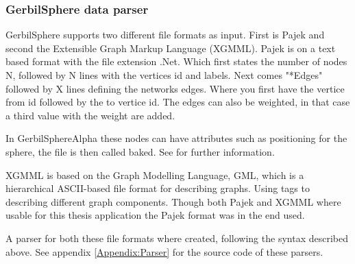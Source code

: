 \documentclass[a4paper,11pt]{kth-mag}
\begin{document}
\begin{appendices}
\subsubsection{GerbilSphere data parser}
GerbilSphere supports two different file formats as input. First is Pajek\cite{website:gephipajek} and second the Extensible Graph Markup Language (XGMML)\cite{website:xgmml}. Pajek is on a text based format with the file 
extension .Net. Which first states the number of nodes N, followed by N lines with the vertices id and labels. Next comes "*Edges" followed by X lines defining the networks edges. Where you first have the vertice from id
followed by the to vertice id. The edges can also be weighted, in that case a third value with the weight are added. 

In GerbilSphereAlpha these nodes can have attributes such as positioning for the sphere, the file is then called baked. See \cite{Shelley20121016} for further information.

XGMML is based on the Graph Modelling Language, GML, which is a hierarchical ASCII-based file format for describing graphs. Using tags to describing different graph components.
Though both Pajek and XGMML where usable for this thesis application the Pajek format was in the end used.

A parser for both these file formats where created, following the syntax described above. See appendix \ref{Appendix:Parser} for the source code of these parsers.
\end{appendices}

\nocite{*}\\

\renewcommand{\bibname}{References}

\end{document}
